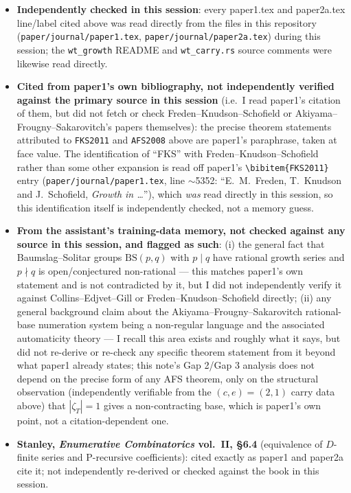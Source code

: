 \documentclass[11pt]{article}
\theoremstyle{remark}
\begin{document}
\begin{itemize}
\item \textbf{Independently checked in this session}: every paper1.tex and paper2a.tex line/label cited
above was read directly from the files in this repository (\texttt{paper/journal/paper1.tex},
\texttt{paper/journal/paper2a.tex}) during this session; the \texttt{wt\_growth} README and
\texttt{wt\_carry.rs} source comments were likewise read directly.
\item \textbf{Cited from paper1's own bibliography, not independently verified against the primary
source in this session} (i.e.\ I read paper1's citation of them, but did not fetch or check
Freden--Knudson--Schofield or Akiyama--Frougny--Sakarovitch's papers themselves): the precise theorem
statements attributed to \texttt{FKS2011} and \texttt{AFS2008} above are paper1's paraphrase, taken at
face value. The identification of ``FKS'' with Freden--Knudson--Schofield rather than some other
expansion is read off paper1's \texttt{\textbackslash bibitem\{FKS2011\}} entry
(\texttt{paper/journal/paper1.tex}, line $\sim$5352: ``E.~M.~Freden, T.~Knudson and J.~Schofield,
\emph{Growth in \dots}''), which \emph{was} read directly in this session, so this identification itself
is independently checked, not a memory guess.
\item \textbf{From the assistant's training-data memory, not checked against any source in this
session, and flagged as such}: (i) the general fact that Baumslag--Solitar groups $\mathrm{BS}(p,q)$
with $p\mid q$ have rational growth series and $p\nmid q$ is open/conjectured non-rational — this
matches paper1's own statement and is not contradicted by it, but I did not independently verify it
against Collins--Edjvet--Gill or Freden--Knudson--Schofield directly; (ii) any general background claim
about the Akiyama--Frougny--Sakarovitch rational-base numeration system being a non-regular language and
the associated automaticity theory — I recall this area exists and roughly what it says, but did not
re-derive or re-check any specific theorem statement from it beyond what paper1 already states; this
note's Gap 2/Gap 3 analysis does not depend on the precise form of any AFS theorem, only on the
structural observation (independently verifiable from the $(c,e)=(2,1)$ carry data above) that
$|\zeta_T|=1$ gives a non-contracting base, which is paper1's own point, not a citation-dependent one.
\item \textbf{Stanley, \emph{Enumerative Combinatorics} vol.\ II, \S6.4} (equivalence of $D$-finite
series and P-recursive coefficients): cited exactly as paper1 and paper2a cite it; not independently
re-derived or checked against the book in this session.
\end{itemize}
\end{document}
